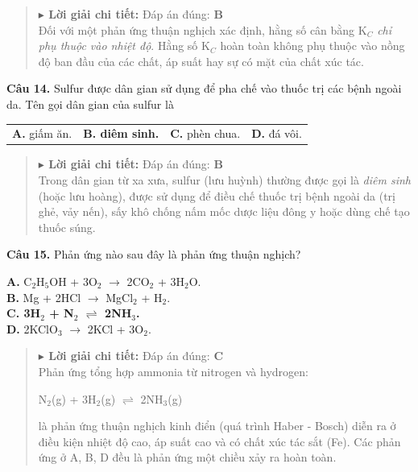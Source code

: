 \documentclass[11pt,a4paper]{article}
\begin{document}
\begin{quote}\small
{\color{myBlue}\textbf{$\blacktriangleright$ Lời giải chi tiết:}} Đáp án đúng: \textbf{\color{red} B}\\
Đối với một phản ứng thuận nghịch xác định, hằng số cân bằng K$_{C}$ \textit{chỉ phụ thuộc vào nhiệt độ}. Hằng số K$_{C}$ hoàn toàn không phụ thuộc vào nồng độ ban đầu của các chất, áp suất hay sự có mặt của chất xúc tác.
\end{quote}
\vspace{2pt}

\textbf{Câu 14.} Sulfur được dân gian sử dụng để pha chế vào thuốc trị các bệnh ngoài da. Tên gọi dân gian của sulfur là

\begin{tabularx}{\textwidth}{@{}XXXX@{}}
\textbf{A.} giấm ăn. & \textbf{\color{red} B. diêm sinh.} & \textbf{C.} phèn chua. & \textbf{D.} đá vôi. \\
\end{tabularx}

\begin{quote}\small
{\color{myBlue}\textbf{$\blacktriangleright$ Lời giải chi tiết:}} Đáp án đúng: \textbf{\color{red} B}\\
Trong dân gian từ xa xưa, sulfur (lưu huỳnh) thường được gọi là \textit{diêm sinh} (hoặc lưu hoàng), được sử dụng để điều chế thuốc trị bệnh ngoài da (trị ghẻ, vảy nến), sấy khô chống nấm mốc dược liệu đông y hoặc dùng chế tạo thuốc súng.
\end{quote}
\vspace{2pt}

\textbf{Câu 15.} Phản ứng nào sau đây là phản ứng thuận nghịch?

\quad \textbf{A.} C$_{2}$H$_{5}$OH + 3O$_{2}$ $\longrightarrow$ 2CO$_{2}$ + 3H$_{2}$O.\\
\quad \textbf{B.} Mg + 2HCl $\longrightarrow$ MgCl$_{2}$ + H$_{2}$.\\
\quad \textbf{\color{red} C. 3H$_{2}$ + N$_{2}$ $\rightleftharpoons$ 2NH$_{3}$.}\\
\quad \textbf{D.} 2KClO$_{3}$ $\longrightarrow$ 2KCl + 3O$_{2}$.\\

\begin{quote}\small
{\color{myBlue}\textbf{$\blacktriangleright$ Lời giải chi tiết:}} Đáp án đúng: \textbf{\color{red} C}\\
Phản ứng tổng hợp ammonia từ nitrogen và hydrogen:

N$_{2}$(g) + 3H$_{2}$(g) $\rightleftharpoons$ 2NH$_{3}$(g)

là phản ứng thuận nghịch kinh điển (quá trình Haber - Bosch) diễn ra ở điều kiện nhiệt độ cao, áp suất cao và có chất xúc tác sắt (Fe). Các phản ứng ở A, B, D đều là phản ứng một chiều xảy ra hoàn toàn.
\end{quote}
\vspace{2pt}
\end{document}
